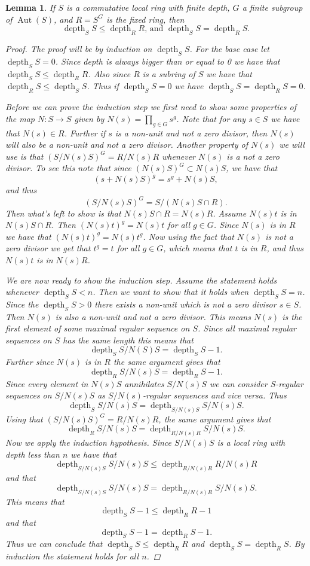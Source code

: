 \documentclass[11pt, a4paper, english]{article}
\newtheorem{lemma}[theorem]{Lemma}
\theoremstyle{definition}
\DeclareMathOperator{\Aut}{Aut}
\DeclareMathOperator{\depth}{depth}
\begin{document}
\begin{lemma}
\label{lem:depth_of_S_less_than_R}
If $S$ is a commutative local ring with finite depth, $G$ a finite subgroup of $\Aut(S)$, and $R=S^G$ is the fixed ring, then $$\depth_SS \leq \depth_RR\text{, and }\depth_SS = \depth_RS.$$
\begin{proof}
The proof will be by induction on $\depth_SS$. For the base case let $\depth_SS = 0$. Since depth is always bigger than or equal to 0 we have that $\depth_SS \leq \depth_RR$. Also since $R$ is a subring of $S$ we have that $\depth_RS \leq \depth_SS$. Thus if $\depth_SS = 0$ we have $\depth_SS = \depth_RS=0$.

Before we can prove the induction step we first need to show some properties of the map $N: S \to S$ given by $N(s) = \prod_{g\in G} s^g$. Note that for any $s \in S$ we have that $N(s) \in R$. Further if $s$ is a non-unit and not a zero divisor, then $N(s)$ will also be a non-unit and not a zero divisor. Another property of $N(s)$ we will use is that $\left(S/N(s)S\right)^G = R/N(s)R$ whenever $N(s)$ is a not a zero divisor. To see this note that since $(N(s)S)^G \subset N(s)S$, we have that $$(s + N(s)S)^g = s^g + N(s)S,$$ and thus $$\left(S/N(s)S\right)^G = S/\left(N(s)S \cap R \right).$$ Then what's left to show is that $N(s)S \cap R = N(s)R$. Assume $N(s)t$ is in $N(s)S\cap R$. Then $(N(s)t)^g = N(s)t$ for all $g \in G$. Since $N(s)$ is in $R$ we have that $(N(s)t)^g = N(s)t^g$. Now using the fact that $N(s)$ is not a zero divisor we get that $t^g = t$ for all $g \in G$, which means that $t$ is in $R$, and thus $N(s)t$ is in $N(s)R$.

We are now ready to show the induction step. Assume the statement holds whenever $\depth_SS < n$. Then we want to show that it holds when $\depth_SS = n$. Since the $\depth_SS > 0$ there exists a non-unit which is not a zero divisor $s \in S$. Then $N(s)$ is also a non-unit and not a zero divisor. This means $N(s)$ is the first element of some maximal regular sequence on $S$. Since all maximal regular sequences on $S$ has the same length this means that $$\depth_S S/N(S)S = \depth_SS -1.$$ Further since $N(s)$ is in $R$ the same argument gives that $$\depth_R S/N(s)S = \depth_RS -1.$$ Since every element in $N(s)S$ annihilates $S/N(s)S$ we can consider $S$-regular sequences on $S/N(s)S$ as $S/N(s)$-regular sequences and vice versa. Thus $$\depth_S S/N(s)S = \depth_{S/N(s)S} S/N(s)S.$$ Using that $\left( S/N(s)S \right)^G = R/N(s)R$, the same argument gives that $$\depth_R S/N(s)S = \depth_{R/N(s)R} S/N(s)S.$$ Now we apply the induction hypothesis. Since $S/N(s)S$ is a local ring with depth less than $n$ we have that $$\depth_{S/N(s)S} S/N(s)S \leq \depth_{R/N(s)R} R/N(s)R$$ and that $$\depth_{S/N(s)S} S/N(s)S = \depth_{R/N(s)R} S/N(s)S.$$ This means that $$\depth_S S -1 \leq \depth_RR -1$$ and that $$\depth_S S - 1 = \depth_R S -1.$$ Thus we can conclude that $\depth_SS \leq \depth_RR$ and $\depth_SS = \depth_RS$. By induction the statement holds for all $n$.
\end{proof}
\end{lemma}
\end{document}

